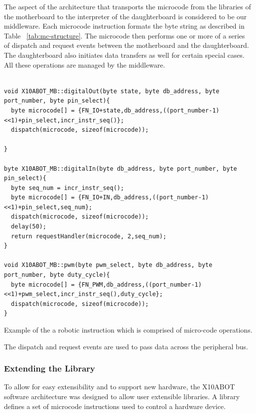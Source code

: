 	The aspect of the \xten architecture that transports the microcode from the libraries of the motherboard to the interpreter of the daughterboard is considered to be our middleware. Each microcode instruction formats the byte string as described in Table ~\ref{tab:mc-structure}. The microcode then performs one or more of a series of dispatch and request events between the motherboard and the daughterboard. The daughterboard also initiates data transfers as well for certain special cases. All these operations are managed by the middleware. 
\begin{listing}
\footnotesize
{\fontsize{8}{6}\selectfont
\begin{verbatim}

void X10ABOT_MB::digitalOut(byte state, byte db_address, byte port_number, byte pin_select){
  byte microcode[] = {FN_IO+state,db_address,((port_number-1)<<1)+pin_select,incr_instr_seq()};
  dispatch(microcode, sizeof(microcode));

}

byte X10ABOT_MB::digitalIn(byte db_address, byte port_number, byte pin_select){
  byte seq_num = incr_instr_seq();
  byte microcode[] = {FN_IO+IN,db_address,((port_number-1)<<1)+pin_select,seq_num};
  dispatch(microcode, sizeof(microcode));
  delay(50);
  return requestHandler(microcode, 2,seq_num);
}

void X10ABOT_MB::pwm(byte pwm_select, byte db_address, byte port_number, byte duty_cycle){
  byte microcode[] = {FN_PWM,db_address,((port_number-1)<<1)+pwm_select,incr_instr_seq(),duty_cycle};
  dispatch(microcode, sizeof(microcode));
}

\end{verbatim}
}
\caption{Example of the a robotic instruction which is comprised of micro-code operations.} 
\end{listing}	

The dispatch and request events are used to pass data across the peripheral bus.
	
	\subsubsection{Extending the Library} %
	\label{ssub:extending_the_library}
	
	To allow for easy extensibility and to support new hardware, the X10ABOT software architecture was designed to allow user extensible libraries. A library defines a set of microcode instructions used to control a hardware device.
	
